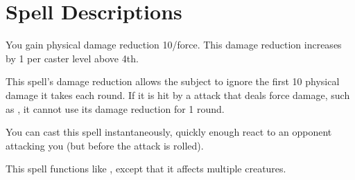 \section{Spell Descriptions}

\begin{comment}
\subsubsection{A}
\end{comment}

\begin{spelleffect}
  You gain physical damage reduction 10/force. This damage reduction increases by 1 per caster level above 4th.
\end{spelleffect}
\begin{spellnotes}
  This spell's damage reduction allows the subject to ignore the first 10 physical damage it takes each round. If it is hit by a attack that deals force damage, such as , it cannot use its damage reduction for 1 round.

  You can cast this spell instantaneously, quickly enough react to an opponent attacking you (but before the attack is rolled).
\end{spellnotes}

\begin{spelleffect}
  This spell functions like , except that it affects multiple creatures.
\end{spelleffect}

